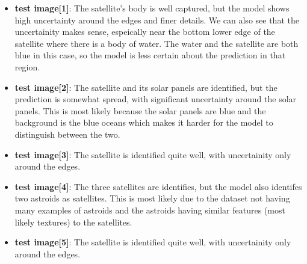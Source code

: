 \documentclass{article}
\begin{document}
\begin{itemize}
    \item \textbf{test image[1]}: The satellite's body is well captured, but the model shows high uncertainty around the 
    edges and finer details. We can also see that the uncertainity makes sense, espeically near the bottom lower edge of 
    the satellite where there is a body of water. The water and the satellite are both blue in this case, so the model is 
    less certain about the prediction in that region.
    \item \textbf{test image[2]}: The satellite and its solar panels are identified, but the prediction is somewhat 
    spread, with significant uncertainty around the solar panels. This is most likely because the solar panels are blue 
    and the background is the blue oceans which makes it harder for the model to distinguish between the two.
    \item \textbf{test image[3]}: The satellite is identified quite well, with uncertainity only around the edges.
    \item \textbf{test image[4]}: The three satellites are identifies, but the model also identifes two astroids as satellites. 
    This is most likely due to the dataset not having many examples of astroids and the astroids having similar features 
    (most likely textures) to the satellites.
    \item \textbf{test image[5]}: The satellite is identified quite well, with uncertainity only around the edges.
\end{itemize}
\vspace{1em}
\end{document}
